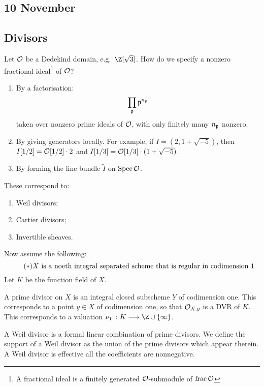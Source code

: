 \documentclass[11pt]{article}
\begin{document}
\begin{Nov10}
\section*{10 November}
\subsection*{Divisors}
Let $\mathcal{O}$ be a Dedekind domain, e.g.\ $\Z[\sqrt3]$. How do we specify a nonzero fractional ideal\footnote{A fractional ideal is a finitely generated $\mathcal{O}$-submodule of $\operatorname{frac}\mathcal{O}$} of $\mathcal{O}$? 
\begin{enumerate}\squishlist
\item By a factorisation:
\[\prod_{\mathfrak{p}}\mathfrak{p}^{n_{\mathfrak{p}}}\]
taken over nonzero prime ideals of $\mathcal{O}$, with only finitely many $n_{\mathfrak{p}}$ nonzero.
\item By giving generators locally. For example, if $I=(2,1+\sqrt{-5})$, then $I[1/2]=\mathcal{O}[1/2]\cdot2$ and $I[1/3]=\mathcal{O}[1/3]\cdot(1+\sqrt{-5})$.
\item By forming the line bundle $\widetilde{I}$ on $\operatorname{Spec}\mathcal{O}$.
\end{enumerate}
These correspond to:
\begin{enumerate}\squishlist
\item Weil divisors;
\item Cartier divisors;
\item Invertible sheaves.
\end{enumerate}
Now assume the following:
\begin{equation}\tag{$*$}
X\textup{ is a noeth integral separated scheme that is regular in codimension 1}
\end{equation}
Let $K$ be the function field of $X$.
\begin{defn*}
A prime divisor on $X$ is an integral closed subscheme $Y$ of codimension one. This corresponds to a point $y\in X$ of codimension one, so that $\mathcal{O}_{X,y}$ is a DVR of $K$. This corresponds to a valuation $\nu_Y:K\to\Z\cup\{\infty\}$.

A Weil divisor is a formal linear combination of prime divisors. We define the support of a Weil divisor as the union of the prime divisors which appear therein. A Weil divisor is effective \Iff all the coefficients are nonnegative.


\end{defn*}
\end{Nov10}
\end{document}
